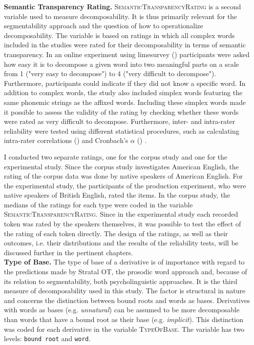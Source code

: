 \textbf{Semantic Transparency Rating.} \textsc{SemanticTransparencyRating} is a second variable used to measure decomposability. It is thus primarily relevant for the segmentability approach and the question of how to operationalize decomposability.  
 The variable is based on ratings in which all complex words included in the studies were rated for their decomposability in terms of semantic transparency.
  In an online experiment using limesurvey (\citealt{LimeSurveyProjectTeam.2015}) participants  were asked how easy it is to decompose a given word into two meaningful parts on a scale from 1 ("very easy to decompose") to 4 ("very difficult to decompose"). Furthermore, participants could indicate if they did not know a specific word. In addition to complex words, the study also included simplex words featuring the same phonemic strings as the affixed words. Including these simplex words made it possible to assess the validity of the rating by checking whether these words were rated as very difficult to decompose. Furthermore, inter- and intra-rater reliability were tested using different statistical procedures, such as calculating intra-rater correlations (\citealt{Bartko.1966}) and Cronbach's $\alpha$ (\citealt{Cronbach.1951}) . 

I conducted two separate ratings, one for the corpus study and one for the experimental study. Since the corpus study investigates American English, the rating of the corpus data was done by native speakers of American English. For the experimental study, the participants of the production experiment, who were native speakers of British English, rated the items. 
In the corpus study, the medians of the ratings for each type were coded in the variable \textsc{SemanticTransparencyRating}. Since in the experimental study each recorded token was rated by the speakers themselves, it was possible to test the effect of the rating of each token directly.
The design of the ratings, as well as their outcomes, i.e. their distributions and the results of the reliability tests, will be discussed further in the pertinent chapters. \\


\textbf{Type of Base.} The type of base of a derivative is of importance with regard to the predictions made by Stratal OT, the prosodic word approach and, because of its relation to segmentability, both psycholinguistic approaches. It is
the third measure of decomposability used in this study. The factor is structural in nature and concerns the distinction between bound roots and words as bases. Derivatives with words as bases  (e.g. \textit{unnatural}) can be assumed to be more decomposable than words that have a bound root as their base  (e.g. \textit{implicit}). This distinction was coded for each derivative in the variable \textsc{TypeOfBase}. The variable has two levels: \texttt{bound root} and \texttt{word}. \\


